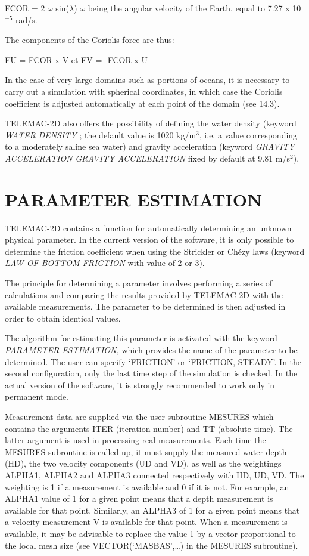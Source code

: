  FCOR = 2 $\omega$ sin($\lambda$)          $\omega$ being the angular velocity of the Earth, equal to 7.27 x 10${}^{-5}$ rad/s.

 The components of the Coriolis force are thus:

 FU = FCOR x V         et         FV = -FCOR x U

 In the case of very large domains such as portions of oceans, it is necessary to carry out a simulation with spherical coordinates, in which case the Coriolis coefficient is adjusted automatically at each point of the domain (see 14.3).

 TELEMAC-2D also offers the possibility of defining the water density (keyword \textit{WATER DENSITY} ; the default value is 1020 kg/m${}^{3}$, i.e. a value corresponding to a moderately saline sea water) and gravity acceleration (keyword \textit{GRAVITY} \textit{ACCELERATION} \textit{GRAVITY ACCELERATION} fixed by default at 9.81 m/s${}^{2}$).


\section{ PARAMETER ESTIMATION}

 TELEMAC-2D contains a function for automatically determining an unknown physical parameter. In the current version of the software, it is only possible to determine the friction coefficient when using the Strickler or Ch\'{e}zy laws (keyword \textit{LAW OF BOTTOM FRICTION} with value of 2 or 3).

 The principle for determining a parameter involves performing a series of calculations and comparing the results provided by TELEMAC-2D with the available measurements. The parameter to be determined is then adjusted in order to obtain identical values.

 The algorithm for estimating this parameter is activated with the keyword \textit{PARAMETER ESTIMATION,} which provides the name of the parameter to be determined. The user can specify `FRICTION' or `FRICTION, STEADY'. In the second configuration, only the last time step of the simulation is checked. In the actual version of the software, it is strongly recommended to work only in permanent mode.

 Measurement data are supplied via the user subroutine MESURES which contains the arguments ITER (iteration number) and TT (absolute time). The latter argument is used in processing real measurements. Each time the MESURES subroutine is called up, it must supply the measured water depth (HD), the two velocity components (UD and VD), as well as the weightings ALPHA1, ALPHA2 and ALPHA3 connected respectively with HD, UD, VD. The weighting is 1 if a measurement is available and 0 if it is not. For example, an ALPHA1 value of 1 for a given point means that a depth measurement is available for that point. Similarly, an ALPHA3 of 1 for a given point means that a velocity measurement V is available for that point. When a measurement is available, it may be advisable to replace the value 1 by a vector proportional to the local mesh size (see VECTOR(`MASBAS',{\dots}) in the MESURES subroutine).

